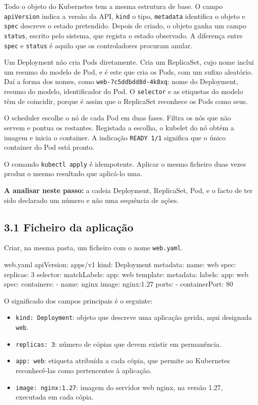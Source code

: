\documentclass[11pt,a4paper]{article}
\newcommand{\cmd}[1]{\texttt{#1}}
\begin{document}
\begin{teoria}
Todo o objeto do Kubernetes tem a mesma estrutura de base. O campo \cmd{apiVersion} indica a versão da API, \cmd{kind} o tipo, \cmd{metadata} identifica o objeto e \cmd{spec} descreve o estado pretendido. Depois de criado, o objeto ganha um campo \cmd{status}, escrito pelo sistema, que regista o estado observado. A diferença entre \cmd{spec} e \cmd{status} é aquilo que os controladores procuram anular.

Um Deployment não cria Pods diretamente. Cria um ReplicaSet, cujo nome inclui um resumo do modelo de Pod, e é este que cria os Pods, com um sufixo aleatório. Daí a forma dos nomes, como \cmd{web-7c5ddbdd8d-4k8xq}: nome do Deployment, resumo do modelo, identificador do Pod. O \cmd{selector} e as etiquetas do modelo têm de coincidir, porque é assim que o ReplicaSet reconhece os Pods como seus.

O scheduler escolhe o nó de cada Pod em duas fases. Filtra os nós que não servem e pontua os restantes. Registada a escolha, o kubelet do nó obtém a imagem e inicia o container. A indicação \cmd{READY 1/1} significa que o único container do Pod está pronto.

O comando \cmd{kubectl apply} é idempotente. Aplicar o mesmo ficheiro duas vezes produz o mesmo resultado que aplicá-lo uma.

\textbf{A analisar neste passo:} a cadeia Deployment, ReplicaSet, Pod, e o facto de ter sido declarado um número e não uma sequência de ações.
\end{teoria}

\subsection*{3.1 Ficheiro da aplicação}

Criar, na mesma pasta, um ficheiro com o nome \cmd{web.yaml}.

\begin{ficheiro}{web.yaml}
apiVersion: apps/v1
kind: Deployment
metadata:
  name: web
spec:
  replicas: 3
  selector:
    matchLabels:
      app: web
  template:
    metadata:
      labels:
        app: web
    spec:
      containers:
        - name: nginx
          image: nginx:1.27
          ports:
            - containerPort: 80
\end{ficheiro}

O significado dos campos principais é o seguinte:

\begin{itemize}
  \item \cmd{kind: Deployment}: objeto que descreve uma aplicação gerida, aqui designada \cmd{web}.
  \item \cmd{replicas: 3}: número de cópias que devem existir em permanência.
  \item \cmd{app: web}: etiqueta atribuída a cada cópia, que permite ao Kubernetes reconhecê-las como pertencentes à aplicação.
  \item \cmd{image: nginx:1.27}: imagem do servidor web nginx, na versão 1.27, executada em cada cópia.
\end{itemize}
\end{document}
